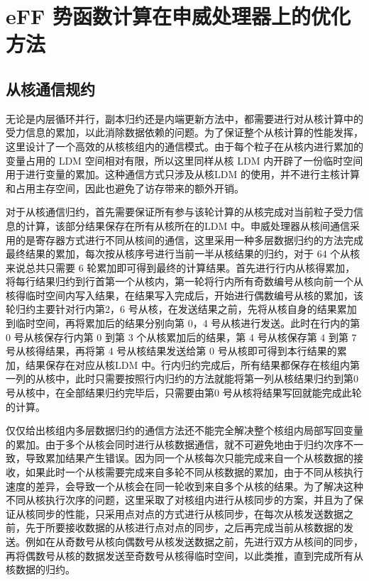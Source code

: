 
\chapter{eFF 势函数计算在申威处理器上的优化方法}

\section{从核通信规约}
无论是内层循环并行，副本归约还是内端更新方法中，都需要进行对从核计算中的受力信息的累加，以此消除数据依赖的问题。为了保证整个从核计算的性能发挥，这里设计了一个高效的从核核组内的通信模式。由于每个粒子在从核内进行累加的变量占用的 LDM 空间相对有限，所以这里同样从核 LDM 内开辟了一份临时空间用于进行变量的累加。这种通信方式只涉及从核LDM 的使用，并不进行主核计算和占用主存空间，因此也避免了访存带来的额外开销。

对于从核通信归约，首先需要保证所有参与该轮计算的从核完成对当前粒子受力信息的计算，该部分结果保存在所有从核所在的LDM 中。申威处理器从核间通信采用的是寄存器方式进行不同从核间的通信，这里采用一种多层数据归约的方法完成最终结果的累加，每次按从核序号进行当前一半从核结果的归约，对于 64 个从核来说总共只需要 6 轮累加即可得到最终的计算结果。首先进行行内从核得累加，将每行结果归约到行首第一个从核内，第一轮将行内所有奇数编号从核向前一个从核得临时空间内写入结果，在结果写入完成后，开始进行偶数编号从核的累加，该轮归约主要针对行内第2，6 号从核，在发送结果之前，先将从核自身的结果累加到临时空间，再将累加后的结果分别向第 0，4 号从核进行发送。此时在行内的第 0 号从核保存行内第 0 到第 3 个从核累加后的结果，第 4 号从核保存第 4 到第 7 号从核得结果，再将第 4 号从核结果发送给第 0 号从核即可得到本行结果的累加，结果保存在对应从核LDM 中。行内归约完成后，所有结果都保存在核组内第一列的从核中，此时只需要按照行内归约的方法就能将第一列从核结果归约到第0 号从核中，在全部结果归约完毕后，只需要由第0 号从核将结果写回就能完成此轮的计算。

仅仅给出核组内多层数据归约的通信方法还不能完全解决整个核组内局部写回变量的累加。由于多个从核会同时进行从核数据通信，就不可避免地由于归约次序不一致，导致累加结果产生错误。因为同一个从核每次只能完成来自一个从核数据的接收，如果此时一个从核需要完成来自多轮不同从核数据的累加，由于不同从核执行速度的差异，会导致一个从核会在同一轮收到来自多个从核的结果。为了解决这种不同从核执行次序的问题，这里采取了对核组内进行从核同步的方案，并且为了保证从核同步的性能，只采用点对点的方式进行从核同步，在每次从核发送数据之前，先于所要接收数据的从核进行点对点的同步，之后再完成当前从核数据的发送。例如在从奇数号从核向偶数号从核发送数据之前，先进行双方从核间的同步，再将偶数号从核的数据发送至奇数号从核得临时空间，以此类推，直到完成所有从核数据的归约。

